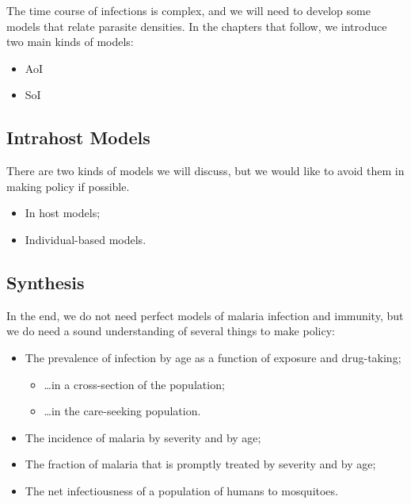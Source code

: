\documentclass[
]{book}
\begin{document}
The time course of infections is complex, and we will need to develop some models that relate parasite densities. In the chapters that follow, we introduce two main kinds of models:

\begin{itemize}
\item
  AoI
\item
  SoI
\end{itemize}

\hypertarget{intrahost-models}{%
\subsection{Intrahost Models}\label{intrahost-models}}

There are two kinds of models we will discuss, but we would like to avoid them in making policy if possible.

\begin{itemize}
\item
  In host models;
\item
  Individual-based models.
\end{itemize}

\hypertarget{synthesis}{%
\subsection{Synthesis}\label{synthesis}}

In the end, we do not need perfect models of malaria infection and immunity, but we do need a sound understanding of several things to make policy:

\begin{itemize}
\item
  The prevalence of infection by age as a function of exposure and drug-taking;

  \begin{itemize}
  \item
    \ldots in a cross-section of the population;
  \item
    \ldots in the care-seeking population.
  \end{itemize}
\item
  The incidence of malaria by severity and by age;
\item
  The fraction of malaria that is promptly treated by severity and by age;
\item
  The net infectiousness of a population of humans to mosquitoes.
\end{itemize}
\end{document}
